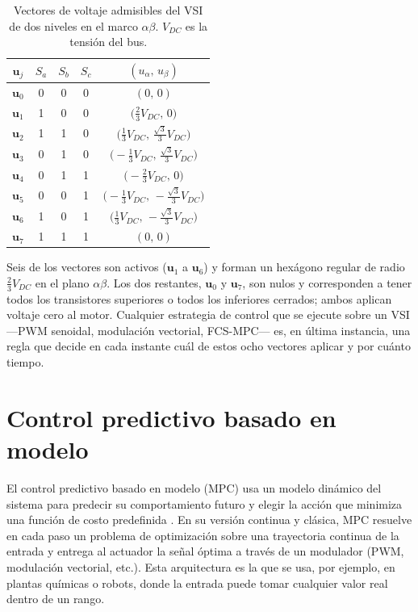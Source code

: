 \documentclass[../../../Tesis_JALS_Maestria.tex]{subfiles}
\begin{document}
\begin{table}[h]
\centering
\small
\caption{Vectores de voltaje admisibles del VSI de dos niveles en el marco $\alpha\beta$. $V_{DC}$ es la tensión del bus.}
\label{tab:vsi-vectores}
\begin{tabular}{ccccc}
\toprule
$\mathbf{u}_j$ & $S_a$ & $S_b$ & $S_c$ & $(u_\alpha,\,u_\beta)$ \\
\midrule
$\mathbf{u}_0$ & 0 & 0 & 0 & $(0,\,0)$ \\
$\mathbf{u}_1$ & 1 & 0 & 0 & $\bigl(\tfrac{2}{3}V_{DC},\,0\bigr)$ \\
$\mathbf{u}_2$ & 1 & 1 & 0 & $\bigl(\tfrac{1}{3}V_{DC},\,\tfrac{\sqrt{3}}{3}V_{DC}\bigr)$ \\
$\mathbf{u}_3$ & 0 & 1 & 0 & $\bigl(-\tfrac{1}{3}V_{DC},\,\tfrac{\sqrt{3}}{3}V_{DC}\bigr)$ \\
$\mathbf{u}_4$ & 0 & 1 & 1 & $\bigl(-\tfrac{2}{3}V_{DC},\,0\bigr)$ \\
$\mathbf{u}_5$ & 0 & 0 & 1 & $\bigl(-\tfrac{1}{3}V_{DC},\,-\tfrac{\sqrt{3}}{3}V_{DC}\bigr)$ \\
$\mathbf{u}_6$ & 1 & 0 & 1 & $\bigl(\tfrac{1}{3}V_{DC},\,-\tfrac{\sqrt{3}}{3}V_{DC}\bigr)$ \\
$\mathbf{u}_7$ & 1 & 1 & 1 & $(0,\,0)$ \\
\bottomrule
\end{tabular}
\end{table}

Seis de los vectores son activos ($\mathbf{u}_1$ a $\mathbf{u}_6$) y forman un hexágono regular de radio $\tfrac{2}{3}V_{DC}$ en el plano $\alpha\beta$. Los dos restantes, $\mathbf{u}_0$ y $\mathbf{u}_7$, son nulos y corresponden a tener todos los transistores superiores o todos los inferiores cerrados; ambos aplican voltaje cero al motor. Cualquier estrategia de control que se ejecute sobre un VSI ---PWM senoidal, modulación vectorial, FCS-MPC--- es, en última instancia, una regla que decide en cada instante cuál de estos ocho vectores aplicar y por cuánto tiempo.

\section{Control predictivo basado en modelo}
\label{sec:mpc}

El control predictivo basado en modelo (MPC) usa un modelo dinámico del sistema para predecir su comportamiento futuro y elegir la acción que minimiza una función de costo predefinida \citep{rodriguez2012predictive, kouro2009mpc}. En su versión continua y clásica, MPC resuelve en cada paso un problema de optimización sobre una trayectoria continua de la entrada y entrega al actuador la señal óptima a través de un modulador (PWM, modulación vectorial, etc.). Esta arquitectura es la que se usa, por ejemplo, en plantas químicas o robots, donde la entrada puede tomar cualquier valor real dentro de un rango.
\end{document}

